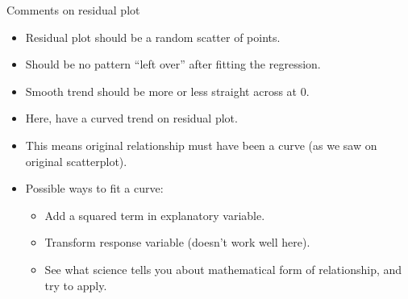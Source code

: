 \documentclass[
  ignorenonframetext,
]{beamer}
\providecommand{\tightlist}{%
  \setlength{\itemsep}{0pt}\setlength{\parskip}{0pt}}
\begin{document}
\begin{frame}{Comments on residual plot}
\protect\hypertarget{comments-on-residual-plot}{}

\begin{itemize}
\tightlist
\item
  Residual plot should be a random scatter of points.
\item
  Should be no pattern ``left over'' after fitting the regression.
\item
  Smooth trend should be more or less straight across at 0.
\item
  Here, have a curved trend on residual plot.
\item
  This means original relationship must have been a curve (as we saw on
  original scatterplot).
\item
  Possible ways to fit a curve:

  \begin{itemize}
  \tightlist
  \item
    Add a squared term in explanatory variable.
  \item
    Transform response variable (doesn't work well here).
  \item
    See what science tells you about mathematical form of relationship,
    and try to apply.
  \end{itemize}
\end{itemize}

\end{frame}
\end{document}
